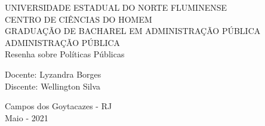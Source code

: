 \begin{center}
    {\large UNIVERSIDADE ESTADUAL DO NORTE FLUMINENSE}
    \\[0.2cm]
    {\large CENTRO DE CIÊNCIAS DO HOMEM}
    \\[0.2cm]
    {\large GRADUAÇÃO DE BACHAREL EM ADMINISTRAÇÃO PÚBLICA}
    \\[0.2cm]
    {\large ADMINISTRAÇÃO PÚBLICA}
    \\[8cm]
    { \huge Resenha sobre Políticas Públicas}
    \\[6cm]
\end{center}

\begin{flushleft}
    Docente: Lyzandra Borges\\[.2cm]
    Discente: Wellington Silva\\[4cm]
\end{flushleft}

\begin{center}
    {\large Campos dos Goytacazes - RJ}\\[0.2cm]
    {\large Maio - 2021}
\end{center}